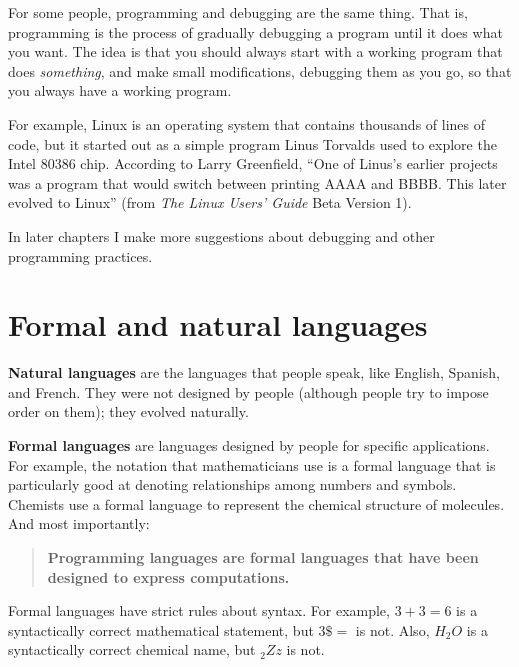 \documentclass[12pt]{book}
\theoremstyle{definition}
\begin{document}

For some people, programming and debugging are the
same thing.  That is, programming is the process of gradually
debugging a program until it does what you want.  The idea
is that you should always start with a working program that
does {\em something}, and make small modifications, debugging
them as you go, so that you always have a working program.

For example, Linux is an operating system that contains thousands of
lines of code, but it started out as a simple program Linus Torvalds
used to explore the Intel 80386 chip.  According to Larry Greenfield,
``One of Linus's earlier projects was a program that would switch
between printing AAAA and BBBB.  This later evolved to Linux''
(from {\em The Linux Users' Guide} Beta Version 1).


In later chapters I make more suggestions about debugging
and other programming practices.

\section{Formal and natural languages}

{\bf Natural languages} are the languages that people speak,
like English, Spanish, and French.  They were not designed
by people (although people try to impose order on them);
they evolved naturally.

{\bf Formal languages} are languages designed by people for
specific applications.  For example, the notation that mathematicians
use is a formal language that is particularly good at denoting
relationships among numbers and symbols.  Chemists use a formal
language to represent the chemical structure of molecules.  And
most importantly:

\begin{quote}
{\bf Programming languages are formal languages that have been
designed to express computations.}
\end{quote}

Formal languages have strict rules
about syntax.  For example, $3+3=6$ is a syntactically correct
mathematical statement, but $3 \$ =$ is not.  Also, $H_2O$ is a
syntactically correct chemical name, but $_2Zz$ is not.
\end{document}
